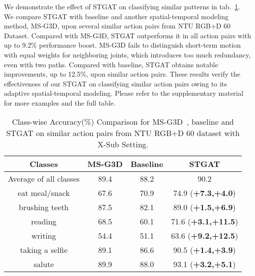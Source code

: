 \documentclass[runningheads]{llncs}
\begin{document}
We demonstrate the effect of STGAT on classifying similar patterns in tab.~\ref{table3}. We compare STGAT with baseline and another spatial-temporal modeling method, MS-G3D, upon several similar action pairs from NTU RGB+D 60 Dataset. Compared with MS-G3D, STGAT outperforms it in all action pairs with up to 9.2\% performance boost. MS-G3D fails to distinguish short-term motion with equal weights for neighboring joints, which introduces too much redundancy, even with two paths. Compared with baseline, STGAT obtains notable improvements, up to 12.5\%, upon similar action pairs. These results verify the effectiveness of our STGAT on classifying similar action pairs owing to its adaptive spatial-temporal modeling. Please refer to the supplementary material for more examples and the full table.
\begin{table}
\centering
\vspace{-5px}
  \begin{tabular}{c|c|c|c}
  \hline
  Classes & MS-G3D    & Baseline & STGAT \\
  \hline
  Average of all classes & 89.4  & 88.2 & 90.2 \\ 
  \hline
  eat meal/snack  &    67.6   & 70.9   & 74.9 (\textbf{+7.3,+4.0})  \\
  brushing teeth  &   87.5    & 82.1   & 89.0 (\textbf{+1.5,+6.9})  \\
  \hline
  reading   &   68.5  & 60.1   & 71.6 (\textbf{+3.1,+11.5}) \\
  writing  &   54.4   & 51.1   & 63.6 (\textbf{+9.2,+12.5})  \\
  \hline
  taking a selfie &   89.1   & 86.6  & 90.5 (\textbf{+1.4,+3.9}) \\
  salute   &   89.9  & 88.0   & 93.1 (\textbf{+3.2,+5.1})  \\
  \hline
  \end{tabular}  
  \caption{Class-wise Accuracy(\%) Comparison for MS-G3D~\cite{liu2020disentangling}, baseline and STGAT on similar action pairs from NTU RGB+D 60 dataset with X-Sub Setting.}
  \vspace{-25px}
  \label{table3}  
  \end{table}
  
\end{document}
